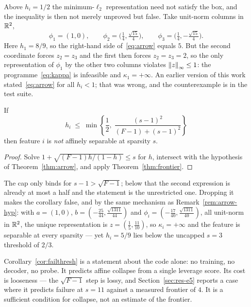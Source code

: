 \begin{remark}
\label{rem:arrow-hyp}
Above $h_i=1/2$ the minimum-$\ell_2$ representation need not satisfy the box, and the inequality
is then not merely unproved but false. Take unit-norm columns in $\mathbb{R}^2$,
\[
  \phi_1=(1,0),\qquad
  \phi_2=\Big(\tfrac14,\tfrac{\sqrt{15}}4\Big),\qquad
  \phi_3=\Big(\tfrac14,-\tfrac{\sqrt{15}}4\Big).
\]
Here $h_1=8/9$, so the right-hand side of~\eqref{eq:arrow} equals $5$. But the second coordinate
forces $z_2=z_3$ and the first then forces $z_2=z_3=2$, so the only representation of $\phi_1$ by
the other two columns violates $\left\lVert z \right\rVert_\infty\le1$: the programme~\eqref{eq:kappa} is infeasible
and $\kappa_1=+\infty$. An earlier version of this work stated~\eqref{eq:arrow} for all $h_i<1$;
that was wrong, and the counterexample is in the test suite.
\end{remark}

\begin{corollary}
\label{cor:failthresh}
If
\[
  h_i\;\le\;\min\left\{\frac12,\;\frac{(s-1)^2}{(F-1)+(s-1)^2}\right\}
\]
then feature $i$ is \emph{not} affinely separable at sparsity $s$.
\end{corollary}

\begin{proof}
Solve $1+\sqrt{(F-1)h/(1-h)}\le s$ for $h$, intersect with the hypothesis of
Theorem~\ref{thm:arrow}, and apply Theorem~\ref{thm:frontier}.
\end{proof}

The cap only binds for $s-1>\sqrt{F-1}$; below that the second expression is already at most a
half and the statement is the unrestricted one. Dropping it makes the corollary false, and by the
same mechanism as Remark~\ref{rem:arrow-hyp}: with $a=(1,0)$,
$b=(-\tfrac{25}{44},\tfrac{\sqrt{1311}}{44})$ and
$\phi_i=(-\tfrac{17}{40},\tfrac{\sqrt{1311}}{40})$, all unit-norm in $\mathbb{R}^2$, the unique
representation is $z=(\tfrac15,\tfrac{11}{10})$, so $\kappa_i=+\infty$ and the feature is separable
at every sparsity --- yet $h_i=5/9$ lies below the uncapped $s=3$ threshold of $2/3$.

Corollary~\ref{cor:failthresh} is a statement about the code alone: no training, no decoder, no
probe. It predicts affine collapse from a single leverage score. Its cost is looseness --- the
$\sqrt{F-1}$ step is lossy, and Section~\ref{sec:res-e5} reports a case where it predicts
failure at $s=11$ against a measured frontier of $4$. It is a sufficient condition for collapse,
not an estimate of the frontier.

